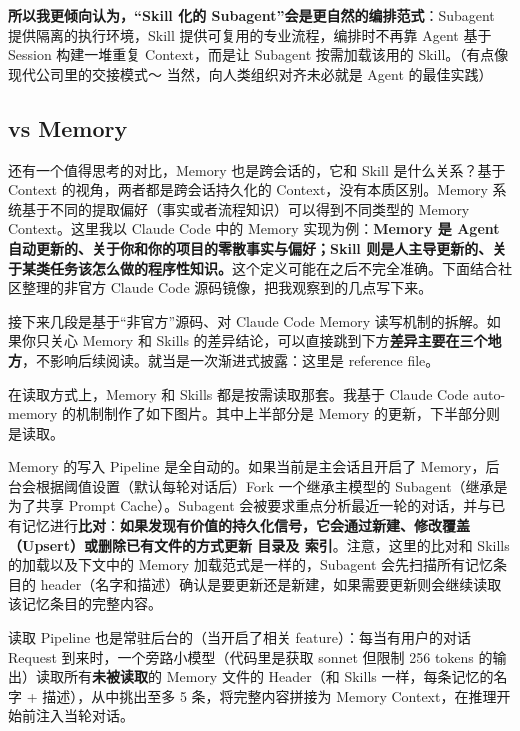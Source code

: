 \textbf{所以我更倾向认为，“Skill 化的 Subagent”会是更自然的编排范式}：Subagent 提供隔离的执行环境，Skill 提供可复用的专业流程，编排时不再靠 Agent 基于 Session 构建一堆重复 Context，而是让 Subagent 按需加载该用的 Skill。（有点像现代公司里的交接模式～ 当然，向人类组织对齐未必就是 Agent 的最佳实践）

\subsection{vs Memory}

还有一个值得思考的对比，Memory 也是跨会话的，它和 Skill 是什么关系？基于 Context 的视角，两者都是跨会话持久化的 Context，没有本质区别。Memory 系统基于不同的提取偏好（事实或者流程知识）可以得到不同类型的 Memory Context。这里我以 Claude Code 中的 Memory 实现为例：\textbf{Memory 是 Agent 自动更新的、关于你和你的项目的零散事实与偏好；Skill 则是人主导更新的、关于某类任务该怎么做的程序性知识。}这个定义可能在之后不完全准确。下面结合社区整理的非官方 Claude Code 源码镜像，把我观察到的几点写下来。

\begin{infobox}[可跳过的深水区]
接下来几段是基于“非官方”源码、对 Claude Code Memory 读写机制的拆解。如果你只关心 Memory 和 Skills 的差异结论，可以直接跳到下方\textbf{差异主要在三个地方}，不影响后续阅读。就当是一次渐进式披露：这里是 reference file。
\end{infobox}

在读取方式上，Memory 和 Skills 都是按需读取那套。我基于 Claude Code auto-memory 的机制制作了如下图片。其中上半部分是 Memory 的更新，下半部分则是读取。


Memory 的写入 Pipeline 是全自动的。如果当前是主会话且开启了 Memory，后台会根据阈值设置（默认每轮对话后）Fork 一个继承主模型的 Subagent（继承是为了共享 Prompt Cache）。Subagent 会被要求重点分析最近一轮的对话，并与已有记忆进行\textbf{比对}：\textbf{如果发现有价值的持久化信号，它会通过新建、修改覆盖（Upsert）或删除已有文件的方式更新  目录及  索引}。注意，这里的比对和 Skills 的加载以及下文中的 Memory 加载范式是一样的，Subagent 会先扫描所有记忆条目的 header（名字和描述）确认是要更新还是新建，如果需要更新则会继续读取该记忆条目的完整内容。

读取 Pipeline 也是常驻后台的（当开启了相关 feature）：每当有用户的对话 Request 到来时，一个旁路小模型（代码里是获取 sonnet 但限制 256 tokens 的输出）读取所有\textbf{未被读取}的 Memory 文件的 Header（和 Skills 一样，每条记忆的名字 + 描述），从中挑出至多 5 条，将完整内容拼接为 Memory Context，在推理开始前注入当轮对话。

